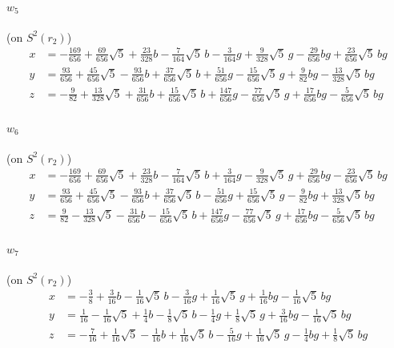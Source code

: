 \documentclass[11pt]{article}
\renewcommand{\_}{\textunderscore\allowbreak}
\theoremstyle{remark}
\begin{document}
{\paragraph{$w_{5}$} (on $S^2(r_2)$)
\begin{align*}
x&=-\tfrac{169}{656}+\tfrac{69}{656}\sqrt5+\tfrac{23}{328}b-\tfrac{7}{164}\sqrt5\,b-\tfrac{3}{164}g+\tfrac{9}{328}\sqrt5\,g-\tfrac{29}{656}bg+\tfrac{23}{656}\sqrt5\,bg\\
y&=\tfrac{93}{656}+\tfrac{45}{656}\sqrt5-\tfrac{93}{656}b+\tfrac{37}{656}\sqrt5\,b+\tfrac{51}{656}g-\tfrac{15}{656}\sqrt5\,g+\tfrac{9}{82}bg-\tfrac{13}{328}\sqrt5\,bg\\
z&=-\tfrac{9}{82}+\tfrac{13}{328}\sqrt5+\tfrac{31}{656}b+\tfrac{15}{656}\sqrt5\,b+\tfrac{147}{656}g-\tfrac{77}{656}\sqrt5\,g+\tfrac{17}{656}bg-\tfrac{5}{656}\sqrt5\,bg
\end{align*}

\paragraph{$w_{6}$} (on $S^2(r_2)$)
\begin{align*}
x&=-\tfrac{169}{656}+\tfrac{69}{656}\sqrt5+\tfrac{23}{328}b-\tfrac{7}{164}\sqrt5\,b+\tfrac{3}{164}g-\tfrac{9}{328}\sqrt5\,g+\tfrac{29}{656}bg-\tfrac{23}{656}\sqrt5\,bg\\
y&=\tfrac{93}{656}+\tfrac{45}{656}\sqrt5-\tfrac{93}{656}b+\tfrac{37}{656}\sqrt5\,b-\tfrac{51}{656}g+\tfrac{15}{656}\sqrt5\,g-\tfrac{9}{82}bg+\tfrac{13}{328}\sqrt5\,bg\\
z&=\tfrac{9}{82}-\tfrac{13}{328}\sqrt5-\tfrac{31}{656}b-\tfrac{15}{656}\sqrt5\,b+\tfrac{147}{656}g-\tfrac{77}{656}\sqrt5\,g+\tfrac{17}{656}bg-\tfrac{5}{656}\sqrt5\,bg
\end{align*}

\paragraph{$w_{7}$} (on $S^2(r_2)$)
\begin{align*}
x&=-\tfrac{3}{8}+\tfrac{3}{16}b-\tfrac{1}{16}\sqrt5\,b-\tfrac{3}{16}g+\tfrac{1}{16}\sqrt5\,g+\tfrac{1}{16}bg-\tfrac{1}{16}\sqrt5\,bg\\
y&=\tfrac{1}{16}-\tfrac{1}{16}\sqrt5+\tfrac{1}{4}b-\tfrac{1}{8}\sqrt5\,b-\tfrac{1}{4}g+\tfrac{1}{8}\sqrt5\,g+\tfrac{3}{16}bg-\tfrac{1}{16}\sqrt5\,bg\\
z&=-\tfrac{7}{16}+\tfrac{1}{16}\sqrt5-\tfrac{1}{16}b+\tfrac{1}{16}\sqrt5\,b-\tfrac{5}{16}g+\tfrac{1}{16}\sqrt5\,g-\tfrac{1}{4}bg+\tfrac{1}{8}\sqrt5\,bg
\end{align*}

}
\end{document}
